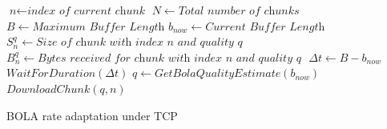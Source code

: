 \begin{algorithm}[t!]
	\begin{algorithmic}[1]
		\State $\textit{n} \gets \textit{index of current chunk}$
		\State $N \gets \textit{Total number of chunks}$
		\State $B \gets \textit{Maximum Buffer Length}$
		\State $b_{now} \gets \textit{Current Buffer Length}$
		\State $S_n^q \gets \textit{Size of chunk with index n and quality q}$
		\State $B_n^q  \gets \textit{Bytes received for chunk with index n and quality q }$
				\State $\Delta t \gets B - b_{now}$
				\State $WaitForDuration (\Delta t)$
			\EndIf
			\State ${q \gets GetBolaQualityEstimate(b_{now})}$
			\State ${DownloadChunk(q, n)}$
		\EndWhile
		\EndProcedure
	\end{algorithmic}
	\caption{BOLA rate adaptation under TCP}
    	\label{algo:tcp_dash}
\end{algorithm}

